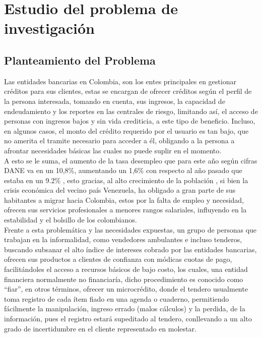 \section{Estudio del problema de investigación}

	\subsection{Planteamiento del Problema}
	
	{Las entidades bancarias en Colombia, son los entes principales en gestionar créditos para sus clientes, estas se encargan de ofrecer créditos según el perfil de la persona interesada, tomando en cuenta, sus ingresos, la capacidad de endeudamiento y los reportes en las centrales de riesgo, limitando así, el acceso de personas con ingresos bajos y sin vida crediticia, a este tipo de beneficio. Incluso, en algunos casos, el monto del crédito requerido por el usuario es tan bajo, que no amerita el tramite necesario para acceder a él, obligando a la persona a afrontar necesidades básicas las cuales no puede suplir en el momento.\\
		
	A esto se le suma, el aumento de la tasa desempleo que para este año según cifras DANE va en un 10,8\%, aumentando un 1,6\% con respecto al año pasado que estaba en un 9.2\% \cite{dane}, esto gracias, al alto crecimiento de la población \cite{unemployment}, si bien la crisis económica del vecino país Venezuela, ha obligado a gran parte de sus habitantes a migrar hacia Colombia, estos por la falta de empleo y necesidad,  ofrecen sus servicios profesionales a menores rangos salariales,  influyendo en la estabilidad y el bolsillo de los colombianos.\\
	
	Frente a esta problemática y las necesidades expuestas, un grupo de personas que trabajan en la informalidad, como vendedores ambulantes e incluso tenderos, buscando subsanar el alto índice de intereses cobrado por las entidades bancarias, ofrecen sus productos a clientes de confianza con módicas cuotas de pago, facilitándoles el acceso a recursos básicos de bajo costo, los cuales, una entidad financiera normalmente no financiaría, dicho procedimiento es conocido como “fiar”, en otros términos, ofrecer un microcrédito, donde el tendero usualmente toma registro de cada ítem fiado en una agenda o cuaderno, permitiendo fácilmente la manipulación, ingreso errado (malos cálculos) y la perdida, de la información, pues el registro estará supeditado al tendero, conllevando a un alto grado de incertidumbre en el cliente representado en molestar.}

